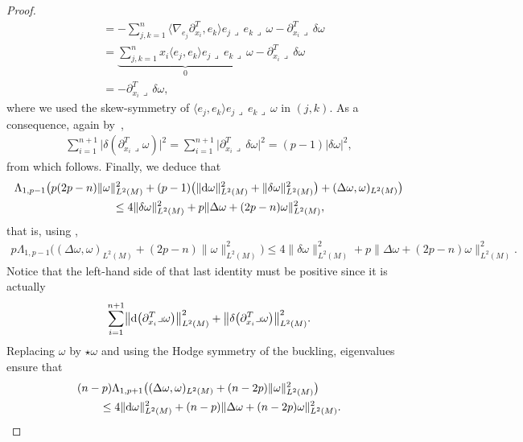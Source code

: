 \documentclass[10pt,a4paper]{amsart}
\numberwithin{equation}{section}
\theoremstyle{definition}
\begin{document}
\begin{proof}
\begin{align*}
&=-\sum_{j,k=1}^n\bigl\langle\nabla_{e_j}\partial_{x_i}^T,e_k\bigr\rangle e_j\lrcorner\,e_k\lrcorner\,\omega-\partial_{x_i}^T\lrcorner\,\delta\omega\\
&=\underbrace{\sum_{j,k=1}^nx_i\langle e_j,e_k\rangle e_j\lrcorner\,e_k\lrcorner\,\omega}_{0}-\partial_{x_i}^T\lrcorner\,\delta\omega\\
&=-\partial_{x_i}^T\lrcorner\,\delta\omega,
\end{align*}
where we used the skew-symmetry of $\langle e_j,e_k\rangle e_j\lrcorner\,e_k\lrcorner\,\omega$ in $(j,k)$.
As a consequence, again by~\cite[equation~(22)]{EGHM},
\begin{align*}
\sum_{i=1}^{n+1}\bigl|\delta(\partial_{x_i}^T\lrcorner\omega)\bigr|^2=\sum_{i=1}^{n+1}\bigl|\partial_{x_i}^T\lrcorner\,\delta\omega\bigr|^2=(p-1)|\delta\omega|^2,
\end{align*}
from which  follows.
Finally, we deduce that
\begin{gather*}
 \Lambda_{1,p-1}\bigl(p(2p-n)\|\omega\|_{L^2(M)}^2+(p-1)\bigl(\|{\rm d}\omega\|_{L^2(M)}^2+\|\delta\omega\|_{L^2(M)}^2\bigr)+(\Delta\omega,\omega)_{L^2(M)}\bigr)\\
\qquad\leq4\|\delta\omega\|^2_{L^2(M)}+p\|\Delta\omega+(2p-n)\omega\|^2_{L^2(M)},
\end{gather*}
that is, using ,
\begin{gather*}
p\Lambda_{1,p-1}\bigl((\Delta\omega,\omega)_{L^2(M)}+(2p-n)\|\omega\|^2_{L^2(M)}\bigr)\leq 4\|\delta\omega\|^2_{L^2(M)}+p\|\Delta\omega+(2p-n)\omega\|^2_{L^2(M)}.
\end{gather*}
Notice that the left-hand side of that last identity must be positive since it is actually
\[
\sum_{i=1}^{n+1}\bigl\|{\rm d}\bigl(\partial_{x_i}^T\lrcorner\omega\bigr)\bigr\|_{L^2(M)}^2+\bigl\|\delta\bigl(\partial_{x_i}^T\lrcorner\omega\bigr)\bigr\|_{L^2(M)}^2.
\]
Replacing $\omega$ by $\star\omega$ and using the Hodge symmetry of the buckling, eigenvalues ensure that
\begin{gather*}
\begin{split}
&(n-p)\Lambda_{1,p+1}\bigl((\Delta\omega,\omega)_{L^2(M)}+(n-2p)\|\omega\|^2_{L^2(M)}\bigr)\\
& \qquad\leq 4\|{\rm d}\omega\|^2_{L^2(M)}+(n-p)\|\Delta\omega+(n-2p)\omega\|^2_{L^2(M)}.
\end{split}

\end{gather*}
\end{proof}
\end{document}

